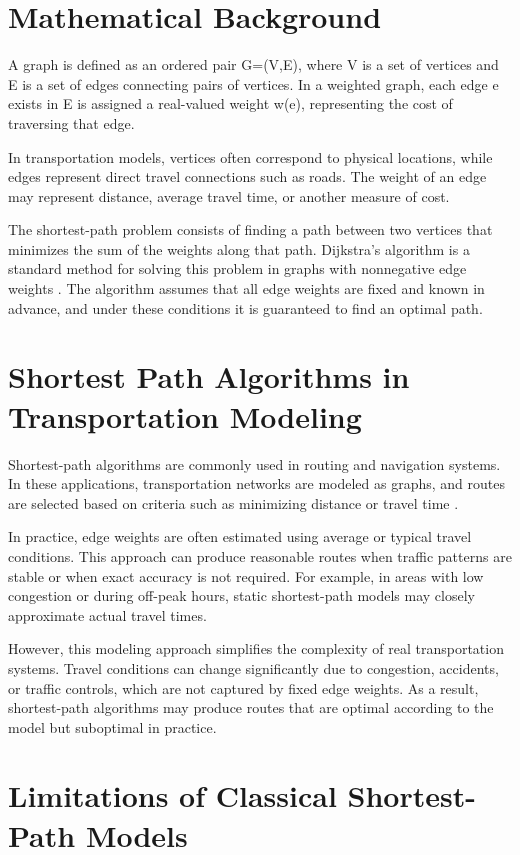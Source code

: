 \documentclass{article}
\begin{document}
\section{Mathematical Background}
A graph is defined as an ordered pair G=(V,E), where V is a set of vertices and E is a set of edges connecting pairs of vertices. In a weighted graph, each edge e exists in E is assigned a real-valued weight w(e), representing the cost of traversing that edge. 

In transportation models, vertices often correspond to physical locations, while edges represent direct travel connections such as roads. The weight of an edge may represent distance, average travel time, or another measure of cost. 

The shortest-path problem consists of finding a path between two vertices that minimizes the sum of the weights along that path. Dijkstra’s algorithm is a standard method for solving this problem in graphs with nonnegative edge weights \cite{dijkstra_1959}. The algorithm assumes that all edge weights are fixed and known in advance, and under these conditions it is guaranteed to find an optimal path. 

\section{Shortest Path Algorithms in Transportation Modeling}

Shortest-path algorithms are commonly used in routing and navigation systems. In these applications, transportation networks are modeled as graphs, and routes are selected based on criteria such as minimizing distance or travel time \cite{cormen_leiserson_rivest_stein_2022}. 

In practice, edge weights are often estimated using average or typical travel conditions. This approach can produce reasonable routes when traffic patterns are stable or when exact accuracy is not required. For example, in areas with low congestion or during off-peak hours, static shortest-path models may closely approximate actual travel times. 

However, this modeling approach simplifies the complexity of real transportation systems. Travel conditions can change significantly due to congestion, accidents, or traffic controls, which are not captured by fixed edge weights. As a result, shortest-path algorithms may produce routes that are optimal according to the model but suboptimal in practice. 

\section{Limitations of Classical Shortest-Path Models}
\end{document}
